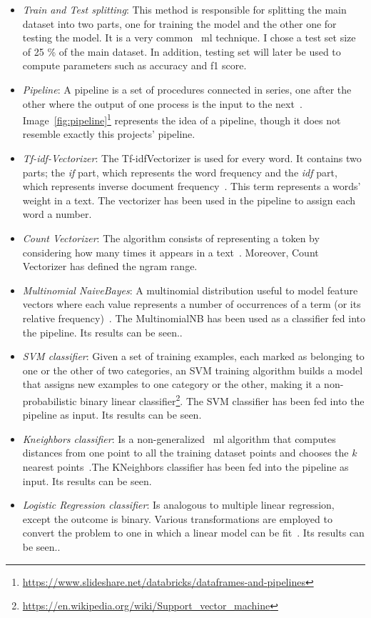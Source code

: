 \begin{itemize}
	\item \textit{Train and Test splitting}: This method is responsible for splitting the main dataset into two parts, one for training the model and the other one for testing the model. It is a very common ~\ac{ml} technique. I chose a test set size of 25 \% of the main dataset. In addition, testing set will later be used to compute parameters such as accuracy and f1 score.
	\item \textit{Pipeline}: A pipeline is a set of procedures connected in series, one after the other where the output of one process is the input to the next~\cite{pipeline1}. Image~\ref{fig:pipeline}\footnote{\url{https://www.slideshare.net/databricks/dataframes-and-pipelines}} represents the idea of a pipeline, though it does not resemble exactly this projects' pipeline.
	\item \textit{Tf-idf-Vectorizer}: The Tf-idfVectorizer is used for every word. It contains two parts; the \textit{if} part, which represents the word frequency and the \textit{idf} part, which represents inverse document frequency~\cite{tfidf1}. This term represents a words' weight in a text. The vectorizer has been used in the pipeline to assign each word a number. 
	\item \textit{Count Vectorizer}: The algorithm consists of representing a token by considering how many times it appears in a text~\cite{countvect1}. Moreover, Count Vectorizer has defined the ngram range.
	\item \textit{Multinomial NaiveBayes}: A multinomial distribution useful to model feature vectors where each value represents a number of occurrences of a term (or its relative frequency)~\cite{countvect1}. The MultinomialNB has been used as a classifier fed into the pipeline. Its results can be seen..
	\item \textit{SVM classifier}: Given a set of training examples, each marked as belonging to one or the other of two categories, an SVM training algorithm builds a model that assigns new examples to one category or the other, making it a non-probabilistic binary linear classifier\footnote{\url{https://en.wikipedia.org/wiki/Support_vector_machine}}. The SVM classifier has been  fed into the pipeline as input. Its results can be seen.
	\item \textit{Kneighbors classifier}: Is a non-generalized ~\ac{ml} algorithm that computes distances from one point to all the training dataset points and chooses the $k$ nearest points~\cite{knn1}.The KNeighbors classifier has been  fed into the pipeline as input. Its results can be seen.
	\item \textit{Logistic Regression classifier}: Is analogous to multiple linear regression, except the outcome is binary. Various transformations are employed to convert the problem to one in which a linear model can be fit~\cite{lr1}. Its results can be seen..
\end{itemize}

